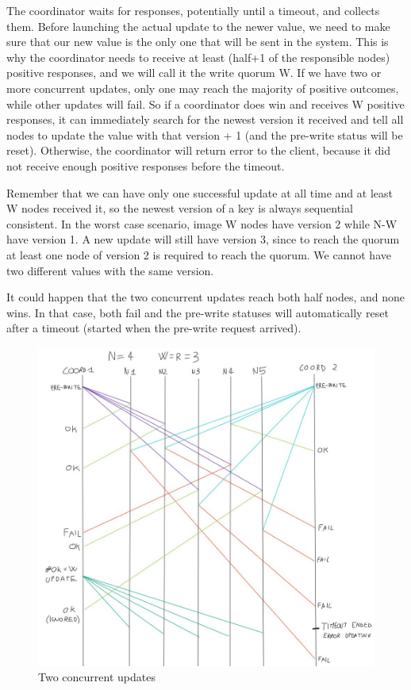 \documentclass[12pt, a4paper]{article}
\begin{document}
    The coordinator waits for responses, potentially until a timeout, and collects them. Before launching the actual update to the newer value, we need to make sure that our new value is the only one that will be sent in the system. This is why the coordinator needs to receive at least (half+1 of the responsible nodes) positive responses, and we will call it the write quorum W. If we have two or more concurrent updates, only one may reach the majority of positive outcomes, while other updates will fail. So if a coordinator does win and receives W positive responses, it can immediately search for the newest version it received and tell all nodes to update the value with that version + 1 (and the pre-write status will be reset). Otherwise, the coordinator will return error to the client, because it did not receive enough positive responses before the timeout.
    
    Remember that we can have only one successful update at all time and at least W nodes received it, so the newest version of a key is always sequential consistent. In the worst case scenario, image W nodes have version 2 while N-W have version 1. A new update will still have version 3, since to reach the quorum at least one node of version 2 is required to reach the quorum. We cannot have two different values with the same version.

    It could happen that the two concurrent updates reach both half nodes, and none wins. In that case, both fail and the pre-write statuses will automatically reset after a timeout (started when the pre-write request arrived). 

    \begin{figure}[H]
        \centering
        \includegraphics[width=\columnwidth]{update timeline.jpg}
        \caption{Two concurrent updates}
    \end{figure}
    
\end{document}
